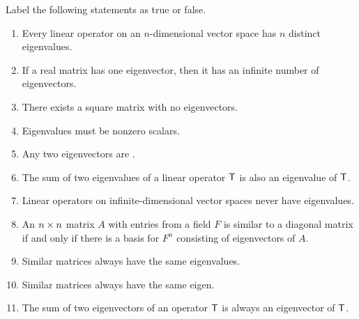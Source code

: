 \exercisesection

\begin{exercise} \label{exercise 5.1.1}
Label the following statements as true or false.
\begin{enumerate}
\item  Every linear operator on an \(n\)-dimensional vector space has \(n\) distinct eigenvalues.
\item If a real matrix has one eigenvector, then it has an infinite number of eigenvectors.
\item There exists a square matrix with no eigenvectors.
\item Eigenvalues must be nonzero scalars.
\item Any two eigenvectors are \LID{}.
\item The sum of two eigenvalues of a linear operator \(\textsf{T}\) is also an eigenvalue of \(\textsf{T}\).
\item Linear operators on infinite-dimensional vector spaces never have eigenvalues.
\item An \(n \times n\) matrix \(A\) with entries from a field \(F\) is similar to a diagonal matrix if and only if there is a basis for \(F^n\) consisting of eigenvectors of \(A\).
\item Similar matrices always have the same eigenvalues.
\item Similar matrices always have the same eigen.
\item The sum of two eigenvectors of an operator \(\textsf{T}\) is always an eigenvector of \(\textsf{T}\).
\end{enumerate}
\end{exercise}

